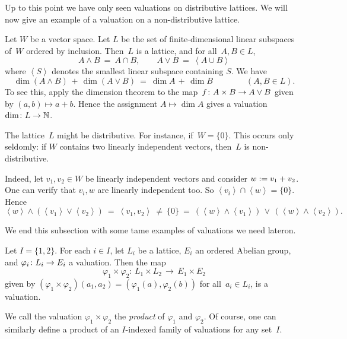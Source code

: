 \documentclass[main.tex]{subfiles}
\begin{document}
%
%
\begin{ex}
Up to this point
we have only seen valuations on distributive lattices.
We will now give an example
of a valuation on a non-distributive lattice.

Let $W$ be a vector space.
Let $L$ be the set of finite-dimensional linear subspaces
of~$W$ ordered by inclusion.
  Then~$L$ is a lattice, and 
for all~$A,B\in L$,
\begin{equation*}
A\wedge B \ =\ A\cap B,
\qquad A\vee B \ =\ \left<A\cup B\right>
\end{equation*}
where $\left< S \right>$ denotes the smallest
linear subspace containing $S$.
We have
\begin{equation*}
\dim (A\wedge B) \,+\, \dim(A\vee B)
\ =\ 
\dim A \,+\, \dim B 
\qquad\qquad(A,B\in L).
\end{equation*}
To see this,
apply the dimension theorem
to the map~$f\colon A\times B\rightarrow A\vee B$ given by  $(a,b)\mapsto a+b$.
Hence the assignment $A \mapsto \dim A$
gives a valuation $\dim\colon L\rightarrow \mathbb{N}$.

The lattice~$L$ might be distributive.
For instance, if~$W=\{ 0 \}$.
This occurs only seldomly:
if $W$ contains two linearly independent vectors,
then~$L$ is non-distributive.

Indeed,
let $v_1,v_2\in W$ be linearly independent vectors
and consider  $w:= v_1 + v_2$.
One can verify that $v_i, w$ are linearly independent too.
So $\left< v_i \right> \cap \left< w \right> = \{0\}$.
Hence
\begin{equation*}
\left< w \right> \wedge(\left< v_1 \right>\vee\left< v_2 \right>)
\ =\ 
\left< v_1, v_2 \right>
\ \neq\ 
\{0\}
\ =\ 
(\left<w\right> \wedge \left<v_1\right>)
\,\vee\, (\left<w\right> \wedge \left<v_2\right>).
\end{equation*}
\end{ex}

We end this subsection
with some tame examples of valuations we 
need lateron.
\begin{ex}
\label{E:val-product}
Let $I=\{ 1,2\}$.
For each $i\in I$, 
let $L_i$ be a lattice,
$E_i$ an ordered Abelian group,
and $\varphi_i \colon L_i \rightarrow E_i$
a valuation.
Then 
the map 
\begin{equation*}
\varphi_1 \times \varphi_2 \colon \,
L_1 \times L_2 \,\longrightarrow\, E_1 \times E_2
\end{equation*}
given by $(\varphi_1 \times\varphi_2)(a_1,a_2) = (\varphi_1(a),\varphi_2(b))$
for all~$a_i\in L_i$, is a valuation.

We call the valuation $\varphi_1 \times \varphi_2$
the \emph{product} of $\varphi_1$ and $\varphi_2$.
Of course,
one can similarly define a product of an $I$-indexed family
of valuations for any set~$I$.
\end{ex}
\end{document}
